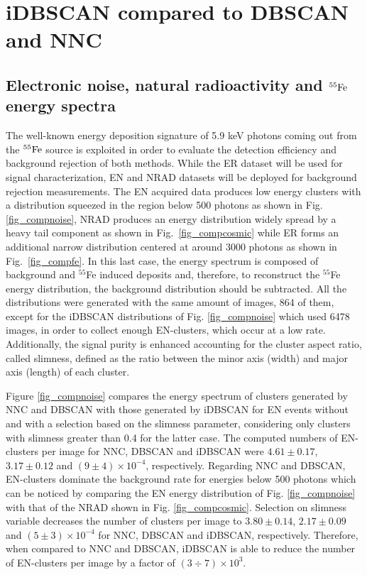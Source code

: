 \documentclass[a4paper,11pt]{article}
\begin{document}
\section{iDBSCAN compared to DBSCAN and NNC}
\label{sec:algoComp}


\subsection{Electronic noise, natural radioactivity and $\rm ^{55}Fe$ energy spectra}

The well-known energy deposition signature of 5.9 keV photons coming out from the $\rm ^{55}Fe$ source is exploited in order to evaluate the detection efficiency and background rejection of both methods. While the ER dataset will be used for signal characterization, EN and NRAD datasets will be deployed for background rejection measurements.
The EN acquired data produces low energy clusters with a distribution squeezed in the region below 500 photons as shown in Fig. \ref{fig_compnoise}, NRAD produces an energy distribution widely spread by a heavy tail component as shown in Fig.~\ref{fig_compcosmic} while ER forms an additional narrow distribution centered at around 3000 photons as shown in Fig.~\ref{fig_compfe}.
In this last case, the energy spectrum is composed of background and $^{55}$Fe induced deposits and, therefore, to reconstruct the $^{55}$Fe energy distribution, the background distribution should be subtracted. All the distributions were generated with the same amount of images, 864 of them, except for the iDBSCAN distributions of Fig. \ref{fig_compnoise} which used 6478 images, in order to collect enough EN-clusters, which occur at a low rate.  
Additionally, the signal purity is enhanced accounting for the cluster aspect ratio, called slimness, defined as the ratio between the minor axis (width) and major axis (length) of each cluster.

Figure \ref{fig_compnoise} compares the energy spectrum of clusters generated by NNC and DBSCAN with those generated by iDBSCAN for EN events without and with a selection based on the slimness parameter, considering only clusters with slimness greater than 0.4 for the latter case. The computed numbers of EN-clusters per image for NNC, DBSCAN and iDBSCAN were $4.61 \pm 0.17$, $3.17 \pm 0.12$ and $(9 \pm 4)\times10^{-4}$, respectively.
Regarding NNC and DBSCAN, EN-clusters dominate the background rate for energies below 500 photons which can be noticed by comparing the EN energy distribution of Fig. \ref{fig_compnoise} with that of the NRAD shown in Fig. \ref{fig_compcosmic}. Selection on slimness variable decreases the number of clusters per image to $3.80 \pm 0.14$, $2.17 \pm 0.09$ and $(5 \pm 3)\times 10^{-4}$ for NNC, DBSCAN and iDBSCAN, respectively. Therefore, when compared to NNC and DBSCAN, iDBSCAN is able to reduce the number of EN-clusters per image by a factor of $(3\div7)\times 10^3$.
\end{document}
